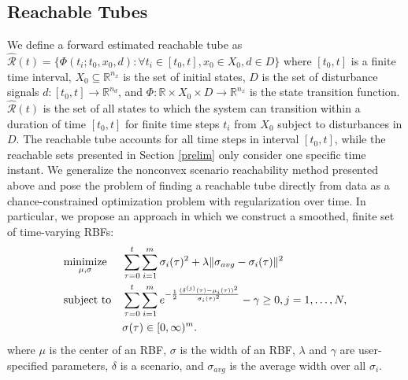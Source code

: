 \documentclass[letterpaper, 10 pt, conference]{ieeeconf}  %
\begin{document}
\subsection{Reachable Tubes}
We define a forward estimated reachable tube as $\hat{\mathcal{R}}(t) = \{\Phi(t_i;t_0, x_0, d) : \forall t_i \in [t_0, t], x_0 \in X_0, d \in D\}$ where $[t_0, t]$ is a finite time interval, $X_0 \subseteq \mathbb{R}^{n_x}$ is the set of initial states, $D$ is the set of disturbance signals $d: [t_0, t] \rightarrow \mathbb{R}^{n_d}$, and $\Phi : \mathbb{R} \times X_0 \times D \rightarrow \mathbb{R}^{n_x}$ is the state transition function. $\hat{\mathcal{R}}(t)$ is the set of all states to which the system can transition within a duration of time $[t_0, t]$ for finite time steps $t_i$ from $X_0$ subject to disturbances in $D$. The reachable tube accounts for all time steps in interval $[t_0, t]$, while the reachable sets presented in Section \ref{prelim} only consider one specific time instant. We generalize the nonconvex scenario reachability method presented above and pose the problem of finding a reachable tube directly from data as a chance-constrained optimization problem with regularization over time. In particular, we propose an approach in which we construct a smoothed, finite set of time-varying RBFs: 
\begin{equation}
\notag
\begin{aligned}
&\underset{\mu, \sigma}{\text{minimize}} 
& &  \sum^t_{\tau=0} \sum^m_{i=1} \sigma_i(\tau)^2 + \lambda \| \sigma_{avg} - \sigma_i(\tau)\|^2 \\
& \text{subject to}
& & \sum^t_{\tau=0} \sum^m_{i=1} e^{-\frac{1}{2}\frac{(\delta^{(j)}(\tau)- \mu_i(\tau))^2}{\sigma_i(\tau)^2}}-\gamma \geq 0, j=1,\dotsc,N,\\
& & & \sigma(\tau) \in [0,\infty)^m.
\end{aligned} 
\end{equation}
where $\mu$ is the center of an RBF, $\sigma$ is the width of an RBF, $\lambda$ and $\gamma$ are user-specified parameters, $\delta$ is a scenario, and $\sigma_{avg}$ is the average width over all $\sigma_i$.
\end{document}
